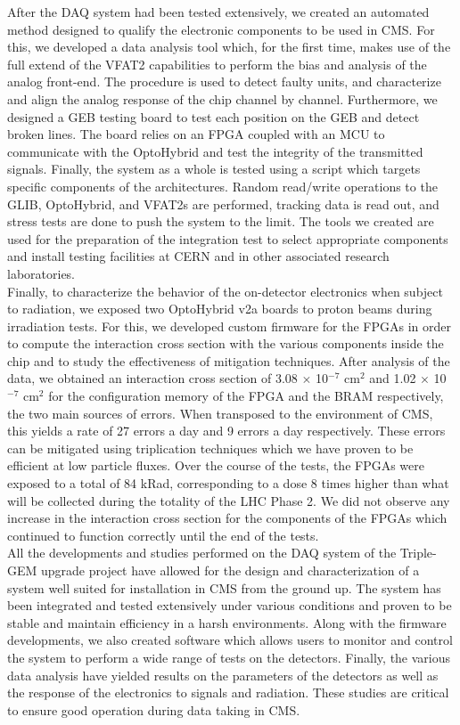   After the DAQ system had been tested extensively, we created an automated method designed to qualify the electronic components to be used in CMS. For this, we developed a data analysis tool which, for the first time, makes use of the full extend of the VFAT2 capabilities to perform the bias and analysis of the analog front-end. The procedure is used to detect faulty units, and characterize and align the analog response of the chip channel by channel. Furthermore, we designed a GEB testing board to test each position on the GEB and detect broken lines. The board relies on an FPGA coupled with an MCU to communicate with the OptoHybrid and test the integrity of the transmitted signals. Finally, the system as a whole is tested using a script which targets specific components of the architectures. Random read/write operations to the GLIB, OptoHybrid, and VFAT2s are performed, tracking data is read out, and stress tests are done to push the system to the limit. The tools we created are used for the preparation of the integration test to select appropriate components and install testing facilities at CERN and in other associated research laboratories. \\

  Finally, to characterize the behavior of the on-detector electronics when subject to radiation, we exposed two OptoHybrid v2a boards to proton beams during irradiation tests. For this, we developed custom firmware for the FPGAs in order to compute the interaction cross section with the various components inside the chip and to study the effectiveness of mitigation techniques. After analysis of the data, we obtained an interaction cross section of 3.08 $ \times $ 10$^{-7}$ cm$^{2}$ and 1.02 $ \times $ 10$^{-7}$ cm$^{2}$ for the configuration memory of the FPGA and the BRAM respectively, the two main sources of errors. When transposed to the environment of CMS, this yields a rate of 27 errors a day and 9 errors a day respectively. These errors can be mitigated using triplication techniques which we have proven to be efficient at low particle fluxes. Over the course of the tests, the FPGAs were exposed to a total of 84 kRad, corresponding to a dose 8 times higher than what will be collected during the totality of the LHC Phase 2. We did not observe any increase in the interaction cross section for the components of the FPGAs which continued to function correctly until the end of the tests. \\

  All the developments and studies performed on the DAQ system of the Triple-GEM upgrade project have allowed for the design and characterization of a system well suited for installation in CMS from the ground up. The system has been integrated and tested extensively under various conditions and proven to be stable and maintain efficiency in a harsh environments. Along with the firmware developments, we also created software which allows users to monitor and control the system to perform a wide range of tests on the detectors. Finally, the various data analysis have yielded results on the parameters of the detectors as well as the response of the electronics to signals and radiation. These studies are critical to ensure good operation during data taking in CMS.
